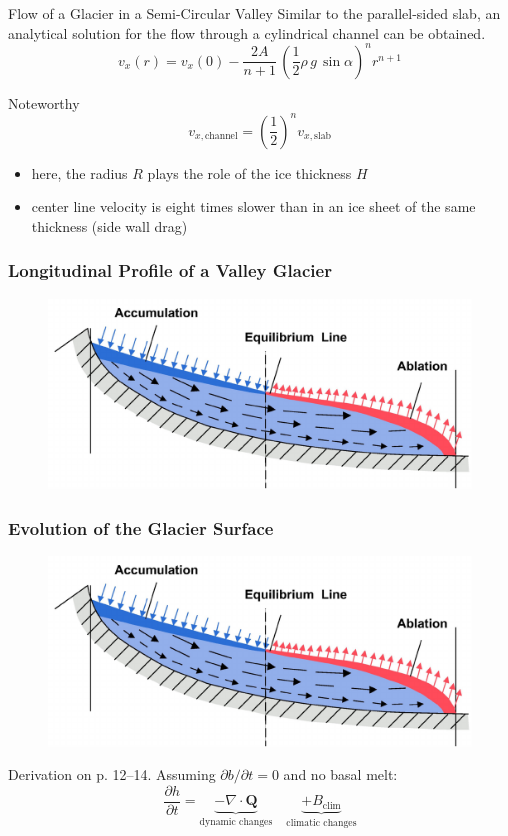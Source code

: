 \documentclass[hide notes,intlimits,unknownkeysallowed]{beamer}
\begin{document}
\begin{frame}{Flow of a Glacier in a Semi-Circular Valley}
 Similar to the parallel-sided slab, an analytical solution for the flow through a cylindrical channel can be obtained.
\begin{equation*}
v_x (r) = v_x (0) - \frac{2A}{n+1}\,\left( \frac{1}{2}\rho\,g\,\sin\alpha\right)^{n} r^{n+1}
\end{equation*}
\begin{block}{Noteworthy}
\begin{equation*}
v_{x, \text{channel}} = \left(\frac{1}{2}\right)^{n} v_{x, \text{slab}}
\end{equation*}
\begin{itemize}
\item here, the radius $R$ plays the role of the ice thickness $H$
\item center line velocity is \alert{eight} times slower than in an
  ice sheet of the same thickness (side wall drag)
\end{itemize}
\end{block}
\end{frame}


\begin{frame}
  \frametitle{Longitudinal Profile of a Valley Glacier}
  \begin{figure}
    \includegraphics[width=\textwidth]{flow_acc_abl}
  \end{figure}
\end{frame}

\begin{frame}
  \frametitle{Evolution of the Glacier Surface}
  \begin{figure}
    \includegraphics[width=.75\textwidth]{flow_acc_abl}
  \end{figure}
  Derivation on p. 12--14. Assuming $\partial b / \partial t = 0$ and no basal melt:
  \begin{equation*}
    \frac{\partial h}{\partial t} = \underbrace{-\nabla \cdot \mathbf{Q}}_{\text{dynamic changes}} \quad \underbrace{+B_{\text{clim}}}_{\text{climatic changes}}
  \end{equation*}
\end{frame}
\end{document}
